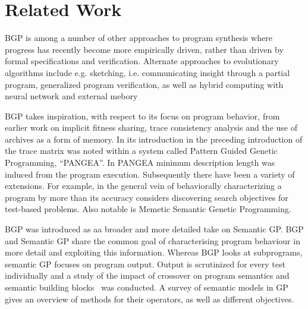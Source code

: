 \section{Related Work}
\label{sec:related-work}

BGP is among a number of other approaches to program synthesis where progress has recently become more empirically driven, rather than driven by formal specifications and verification\cite{Basin04synthesisof}.
Alternate approaches to evolutionary algorithms include e.g. sketching\cite{solar2008program}, i.e. communicating insight through a partial program, generalized program verification\cite{srivastava2010program}, as well as hybrid computing with neural network and external mebory\cite{graves2016hybrid}

BGP takes inspiration, with respect to its focus on program behavior, from earlier work on implicit fitness
sharing\cite{mckay2000fitness}, trace consistency analysis and the use of archives as a form of memory\cite{haynes1997line}. 
In its introduction in \cite{krawiec2014pattern} the preceding introduction of
the trace matrix was noted within a system called Pattern Guided Genetic Programming, ``PANGEA''. 
In PANGEA  minimum description length was induced from the program execution.
Subsequently there have been a variety of extensions. For example, in the general
vein of behaviorally characterizing a program by more than its
accuracy \cite{liskowski2016online} considers discovering search objectives for test-based
problems. Also notable is Memetic Semantic Genetic
Programming\cite{Ffrancon:2015:MSG:2739480.2754697}.

BGP was introduced as aa broader and more detailed take on Semantic GP. BGP and Semantic GP share the common goal of
characterising program behaviour in more detail and exploiting this
information. Whereas BGP looks at subprograms, semantic GP focuses on
program output.  Output is scrutinized for every test individually and a study of the impact of crossover on program semantics
and semantic building blocks~\cite{mcphee2008semantic} was conducted. A survey of
semantic models in GP~\cite{vanneschi2014survey} gives an overview of
methods for their operators, as well as different objectives.

